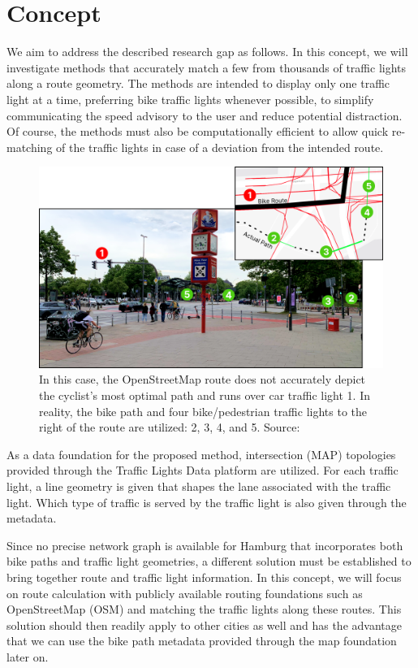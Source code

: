 \section{Concept}

We aim to address the described research gap as follows. In this concept, we will investigate methods that accurately match a few from thousands of traffic lights along a route geometry. The methods are intended to display only one traffic light at a time, preferring bike traffic lights whenever possible, to simplify communicating the speed advisory to the user and reduce potential distraction. Of course, the methods must also be computationally efficient to allow quick re-matching of the traffic lights in case of a deviation from the intended route.

\begin{figure}[t]
\centering
\includegraphics[width=\linewidth]{images/sg-selection-example.png}
\caption{In this case, the OpenStreetMap route does not accurately depict the cyclist's most optimal path and runs over car traffic light 1. In reality, the bike path and four bike/pedestrian traffic lights to the right of the route are utilized: 2, 3, 4, and 5. Source: \cite{matthes2023geo}}
\label{fig:sg-selection-example}
\end{figure}

As a data foundation for the proposed method, intersection (MAP) topologies provided through the Traffic Lights Data platform are utilized. For each traffic light, a line geometry is given that shapes the lane associated with the traffic light. Which type of traffic is served by the traffic light is also given through the metadata.

Since no precise network graph is available for Hamburg that incorporates both bike paths and traffic light geometries, a different solution must be established to bring together route and traffic light information. In this concept, we will focus on route calculation with publicly available routing foundations such as OpenStreetMap (OSM) and matching the traffic lights along these routes. This solution should then readily apply to other cities as well and has the advantage that we can use the bike path metadata provided through the map foundation later on.

